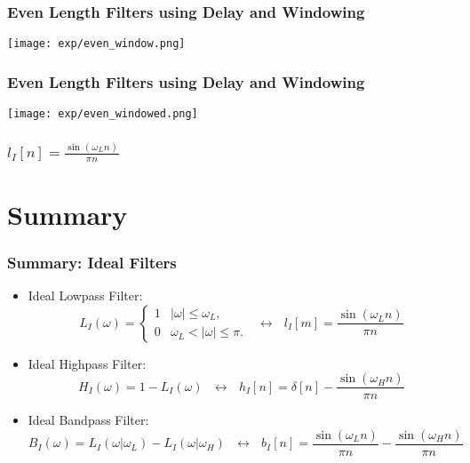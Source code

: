 \documentclass{beamer}
\begin{document}
\begin{frame}
  \frametitle{Even Length Filters using Delay and Windowing}
  \centerline{\texttt{[image: exp/even\_window.png]}}
\end{frame}

\begin{frame}
  \frametitle{Even Length Filters using Delay and Windowing}

  \centerline{\texttt{[image: exp/even\_windowed.png]}}
\end{frame}

\begin{frame}
  \frametitle{$l_I[n]=\frac{\sin(\omega_L n)}{\pi n}$}

  \centerline{}  
\end{frame}

\section[Summary]{Summary}
\setcounter{subsection}{1}

\begin{frame}
  \frametitle{Summary: Ideal Filters}
  \begin{itemize}
  \item Ideal Lowpass Filter:
    \[
    L_I(\omega)
    = \begin{cases} 1& |\omega|\le\omega_L,\\
      0 & \omega_L<|\omega|\le\pi.
    \end{cases}~~~\leftrightarrow~~~
    l_I[m]=\frac{\sin(\omega_L n)}{\pi n}
    \]
  \item Ideal Highpass Filter:
    \[
    H_I(\omega)=1-L_I(\omega)~~~\leftrightarrow~~~
    h_I[n]=\delta[n]-\frac{\sin(\omega_H n)}{\pi n}
    \]
  \item Ideal Bandpass Filter:
    \[
    B_I(\omega)=L_I(\omega|\omega_L)-L_I(\omega|\omega_H)~~~\leftrightarrow~~~
    b_I[n]=\frac{\sin(\omega_L n)}{\pi n}-\frac{\sin(\omega_H n)}{\pi n}
    \]
  \end{itemize}
\end{frame}
\end{document}
